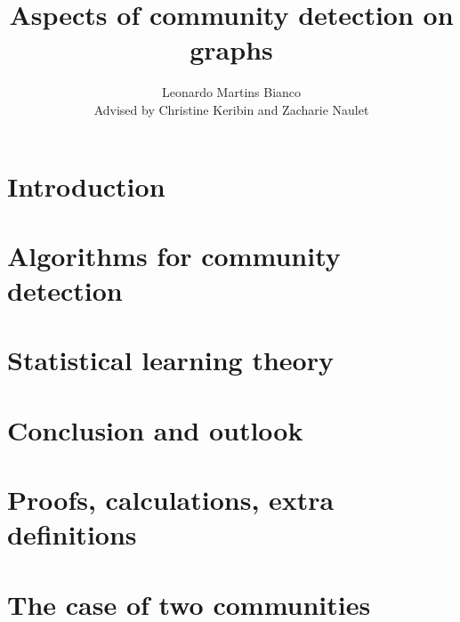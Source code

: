 \documentclass[11pt]{report}
\title{Aspects of community detection on graphs}
\author{Leonardo Martins Bianco\\[0.5cm]{\small Advised by Christine 
Keribin and Zacharie Naulet}}
\date{ }  %
\begin{document}
\maketitle
\setcounter{tocdepth}{1}
\tableofcontents

\chapter{Introduction}


\chapter{Algorithms for community detection}



\chapter{Statistical learning theory}





%

\chapter{Conclusion and outlook}


\appendix

\chapter{Proofs, calculations, extra 
definitions}








\chapter{The case of two communities}


\clearpage  %
\nocite{*}  %


\end{document}
